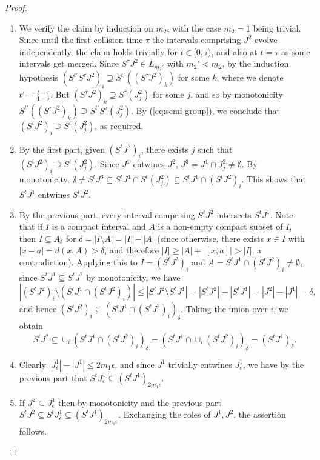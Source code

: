 \documentclass[11pt]{article}
\theoremstyle{definition}
\theoremstyle{proof}
\DeclareMathOperator{\+}{\mathop{\tilde{+}}}
\newcommand{\J}{L}
\newcommand{\eps}{\epsilon}
\numberwithin{equation}{section}
\numberwithin{equation}{section}
\begin{document}
\begin{proof} \hfill
\begin{enumerate}
\item We verify the claim by induction on $m_2$, with the case $m_2 = 1$ being trivial. Since until the first collision time $\tau$ the intervals comprising $J^2$ evolve independently, the claim holds trivially for $t \in [0,\tau)$, and also at $t = \tau$ as some intervals get merged. Since $S^\tau  J^2 \in \J_{m_2'}$ with $m_2' < m_2$, by the induction hypothesis $(S^{t'} S^\tau J^2)_i \supseteq S^{t'}( (S^\tau J^2)_k)$ for some $k$, where we denote $t' = \frac{t-\tau}{1-\tau}$. But $(S^\tau J^2)_k \supseteq S^\tau(J^2_j)$ for some $j$, and so by monotonicity $S^{t'}( (S^\tau J^2)_k) \supseteq S^{t'} S^\tau (J^2_j)$. By (\ref{eq:semi-group}), we conclude that $(S^t J^2)_i \supseteq S^t(J^2_j)$, as required.
\item By the first part, given $(S^t J^2)_i$, there exists $j$ such that $(S^t J^2)_i \supseteq S^t(J^2_j)$. Since $J^1$ entwines $J^2$, $J^3 = J^1 \cap J^2_j \neq \emptyset$. By monotonicity,  $\emptyset \neq S^t J^3 \subseteq S^t J^1 \cap S^t (J^2_j) \subseteq S^t J^1 \cap (S^t J^2)_i$. This shows that $S^t J^1$ entwines $S^t J^2$. 
\item
By the previous part, every interval comprising $S^t J^2$ intersects $S^t J^1$. Note that if $I$ is a compact interval and $A$ is a non-empty compact subset of $I$, then $I \subseteq A_\delta$ for $\delta = |I \setminus A| = |I| - |A|$ (since otherwise, there exists $x \in I$ with $|x-a| = d(x,A) > \delta$, and therefore $|I| \geq |A| + |[x,a]| > |I|$, a contradiction). Applying this to $I = (S^t J^2)_i$ and $A = S^t J^1 \cap (S^t J^2)_i \neq \emptyset$,  since $S^t J^1 \subseteq S^t J^2$ by monotonicity, we have
\[
|(S^t J^2)_i \setminus (S^t J^1 \cap (S^t J^2)_i)| \leq |S^t J^2 \setminus S^t J^1| = |S^t J^2| - |S^t J^1| = |J^2| - |J^1| = \delta ,
\]
and hence $(S^t J^2)_i  \subseteq (S^t J^1 \cap (S^t J^2)_i)_\delta$. Taking the union over $i$, we obtain
\[
S^t J^2 \subseteq \cup_i (S^t J^1 \cap (S^t J^2)_i)_\delta = (S^t J^1 \cap \cup_i (S^t J^2)_i)_\delta = (S^t J^1)_\delta . 
\]
\item Clearly $|J^1_\eps| - |J^1|\leq 2 m_1 \eps$, and since $J^1$ trivially entwines $J^1_\eps$, we have by the previous part that $S^t J^1_\eps \subseteq (S^t J^1)_{2 m_1 \eps}$. 
\item If $J^2 \subseteq J^1_\eps$ then by monotonicity and the previous part $S^t J^2 \subseteq S^t J^1_\eps \subseteq (S^t J^1)_{2 m_1 \eps}$. Exchanging the roles of $J^1,J^2$, the assertion follows. 
\end{enumerate}
\end{proof}
\end{document}
